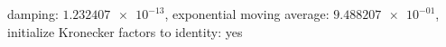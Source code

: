 damping: $\num[scientific-notation=true]{1.232407e-13}$, exponential moving average: $\num[scientific-notation=true]{9.488207e-01}$, initialize Kronecker factors to identity: yes